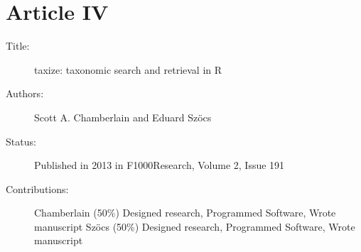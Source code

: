 \section*{Article IV}
\small
\begin{description}
	\item[Title:] taxize: taxonomic search and retrieval in R
	\item[Authors:] Scott A. Chamberlain and Eduard Szöcs
	\item[Status:] Published in 2013 in F1000Research, Volume 2, Issue 191
	\item[Contributions:] Chamberlain (50\%) Designed research, Programmed Software, Wrote manuscript \newline
	Szöcs (50\%) Designed research, Programmed Software, Wrote manuscript
\end{description}
